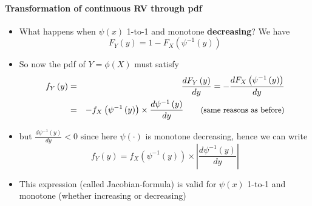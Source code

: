 \documentclass[smaller]{beamer}\usepackage[]{graphicx}\usepackage[]{color}
\newenvironment{stepitemize}{\begin{itemize}[<+->]}{\end{itemize} }
\begin{document}
\begin{frame}{\secname}
  \framesubtitle{Transformation of continuous RV through pdf}

  \begin{stepitemize}
  \item What happens when $\psi \left( x\right) $ 1-to-1 and monotone \textbf{%
  decreasing}? We have%
  \begin{equation*}
  F_{Y}\left( y\right) =1-F_{X}\left( \psi ^{-1}\left( y\right) \right)
  \end{equation*}

  \item So now the pdf of $Y=\phi \left( X\right) $ must satisfy
  \begin{eqnarray*}
  f_{Y}\left( y\right) &=&\frac{dF_{Y}\left( y\right) }{dy}=-\frac{%
  dF_{X}\left( \psi ^{-1}\left( y\right) \right) }{dy} \\
  &=&-f_{X}\left( \psi ^{-1}\left( y\right) \right) \times \frac{d\psi
  ^{-1}\left( y\right) }{dy}\qquad \text{{\small (same reasons as before)}}
  \end{eqnarray*}

  \item but $\frac{d\psi ^{-1}\left( y\right) }{dy}<0$ since here $\psi \left(
  \cdot \right) $ is monotone decreasing, hence we can write%
  \begin{equation*}
  f_{Y}\left( y\right) =f_{X}\left( \psi ^{-1}\left( y\right) \right) \times
  \left\vert \frac{d\psi ^{-1}\left( y\right) }{dy}\right\vert
  \end{equation*}

  \item This expression (called Jacobian-formula) is valid for $\psi \left( x\right) $ 1-to-1 and
  monotone (whether increasing or decreasing)
  \end{stepitemize}
\end{frame}
\end{document}
